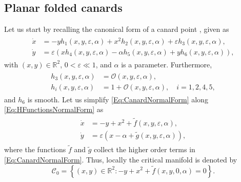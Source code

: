 \documentclass[3p]{elsarticle}
\theoremstyle{plain}
\theoremstyle{remark}
\theoremstyle{definition}
\begin{document}
    \subsection{Planar folded canards}
    \label{Sec:PlanarFoldedCanards}
         Let us start by recalling the canonical form of a canard point \cite{Ref:Krupa2001}, given as
        \begin{align}
            \begin{split}
                \dot{x} &= -yh_{1}\left( x, y, \varepsilon, \alpha \right) + x^{2}h_{2}\left( x, y, \varepsilon, 
                \alpha\right) + \varepsilon h_{3}\left( x, y, \varepsilon, \alpha \right),\\
                \dot{y} &= \varepsilon \left( xh_{4}\left( x, y, \varepsilon, \alpha \right) - \alpha h_{5}\left( x, y, \varepsilon, \alpha \right) + y h_{6}\left( x, y, \varepsilon, \alpha \right) \right),
            \end{split}
            \label{Eq:CanardNormalForm}
        \end{align}
        with $(x, y)\in \mathbb{R}^{2}$, $0<\varepsilon \ll 1$, and $\alpha$ is a parameter. Furthermore,
        \begin{align}
            \begin{split}
                h_{3}(x, y, \varepsilon, \alpha) &= \mathcal{O}(x, y, \varepsilon, \alpha),\\
                h_{i}(x, y, \varepsilon, \alpha) &= 1 + \mathcal{O}(x, y, \varepsilon, \alpha), \quad i = 1, 2, 4, 5,
            \end{split}
            \label{Eq:HFunctionsNormalForm}
        \end{align}
        and $h_{6}$ is smooth. Let us simplify \eqref{Eq:CanardNormalForm} along \eqref{Eq:HFunctionsNormalForm} as
        \begin{align}
            \begin{split}
                \dot{x} &= -y + x^{2} + \tilde{f}(x, y, \varepsilon, \alpha),\\
                \dot{y} &= \varepsilon(x - \alpha + \tilde{g}(x, y, \varepsilon, \alpha)),
            \end{split}
            \label{Eq:SimplifiedNormalForm}
        \end{align}
        where the functions $\tilde{f}$ and $\tilde{g}$ collect the higher order terms in \eqref{Eq:CanardNormalForm}. Thus, locally the critical manifold is denoted by
        \begin{equation}
            \mathcal{C}_{0} = \left\{ (x, y) \in \mathbb{R}^{2}: -y + x^{2} + \tilde{f}(x, y, 0, \alpha) = 0 \right\}.
            \label{Eq:CriticalManifoldNormalForm}
        \end{equation}
\end{document}
